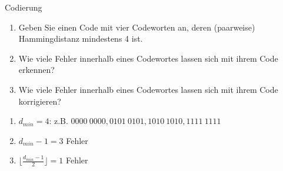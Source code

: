 \documentclass{article}
\begin{document}
\begin{exercise}{Codierung}
  \begin{enumerate}
    \item Geben Sie einen Code mit vier Codeworten an, deren (paarweise) Hammingdistanz mindestens 4 ist.\points[4]
    \item Wie viele Fehler innerhalb eines Codewortes lassen sich mit ihrem Code erkennen?\points
    \item Wie viele Fehler innerhalb eines Codewortes lassen sich mit ihrem Code korrigieren?\points
  \end{enumerate}
\end{exercise}

\begin{solution}
  \begin{enumerate}
    \item $d_{min}=4$: z.B. $0000\ 0000, 0101\ 0101, 1010\ 1010, 1111\ 1111$
    \item $d_{min}-1=3$ Fehler
    \item $\lfloor\frac{d_{min}-1}{2}\rfloor=1$ Fehler
  \end{enumerate}
\end{solution}
\end{document}
